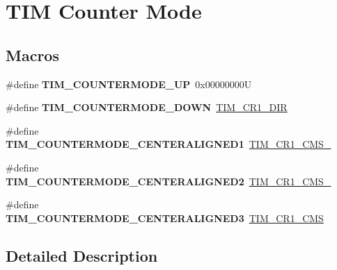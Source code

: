 \hypertarget{group___t_i_m___counter___mode}{}\section{T\+IM Counter Mode}
\label{group___t_i_m___counter___mode}
\subsection*{Macros}
\begin{DoxyCompactItemize}
\item 
\mbox{\label{group___t_i_m___counter___mode_ga9eb9ab91119c2c76d4db453d599c0b7d}} 
\#define {\bfseries T\+I\+M\+\_\+\+C\+O\+U\+N\+T\+E\+R\+M\+O\+D\+E\+\_\+\+UP}~0x00000000U
\item 
\mbox{\label{group___t_i_m___counter___mode_ga5f590fdd7c41df7180b870bb76ff691c}} 
\#define {\bfseries T\+I\+M\+\_\+\+C\+O\+U\+N\+T\+E\+R\+M\+O\+D\+E\+\_\+\+D\+O\+WN}~\mbox{\hyperlink{group___peripheral___registers___bits___definition_gacea10770904af189f3aaeb97b45722aa}{T\+I\+M\+\_\+\+C\+R1\+\_\+\+D\+IR}}
\item 
\mbox{\label{group___t_i_m___counter___mode_ga26d8e5236c35d85c2abaa482b5ec6746}} 
\#define {\bfseries T\+I\+M\+\_\+\+C\+O\+U\+N\+T\+E\+R\+M\+O\+D\+E\+\_\+\+C\+E\+N\+T\+E\+R\+A\+L\+I\+G\+N\+E\+D1}~\mbox{\hyperlink{group___peripheral___registers___bits___definition_ga83ca6f7810aba73dc8c12f22092d97a2}{T\+I\+M\+\_\+\+C\+R1\+\_\+\+C\+M\+S\+\_}}
\item 
\mbox{\label{group___t_i_m___counter___mode_gae4517c68086ffa61a694576cec8fe634}} 
\#define {\bfseries T\+I\+M\+\_\+\+C\+O\+U\+N\+T\+E\+R\+M\+O\+D\+E\+\_\+\+C\+E\+N\+T\+E\+R\+A\+L\+I\+G\+N\+E\+D2}~\mbox{\hyperlink{group___peripheral___registers___bits___definition_gab3ee4adcde3c001d3b97d2eae1730ea9}{T\+I\+M\+\_\+\+C\+R1\+\_\+\+C\+M\+S\+\_}}
\item 
\mbox{\label{group___t_i_m___counter___mode_gaf0c3edf6ea1ade3520ab4970e1fc6e92}} 
\#define {\bfseries T\+I\+M\+\_\+\+C\+O\+U\+N\+T\+E\+R\+M\+O\+D\+E\+\_\+\+C\+E\+N\+T\+E\+R\+A\+L\+I\+G\+N\+E\+D3}~\mbox{\hyperlink{group___peripheral___registers___bits___definition_ga352b3c389bde13dd6049de0afdd874f1}{T\+I\+M\+\_\+\+C\+R1\+\_\+\+C\+MS}}
\end{DoxyCompactItemize}


\subsection{Detailed Description}
